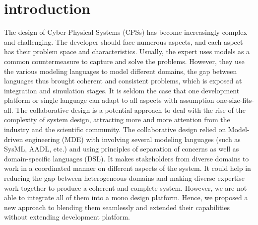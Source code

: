 \section{introduction}
The design of Cyber-Physical Systems (CPSs) has become increasingly complex and challenging.
The developer should face numerous aspects, and each aspect has their problem space and characteristics. Usually, the expert uses models as a common countermeasure to capture and solve the problems. However, they use the various modeling languages to model different domains, the gap between languages thus brought coherent and consistent problems, which is exposed at integration and simulation stages. It is seldom the case that one development platform or single language can adapt to all aspects with assumption one-size-fits-all. The collaborative design is a potential approach to deal with the rise of the complexity of system design, attracting more and more attention from the industry and the scientific community. The collaborative design relied on Model-driven engineering (MDE) with involving several modeling languages (such as SysML, AADL, etc.) and using principles of separation of concerns as well as domain-specific languages (DSL). It makes stakeholders from diverse domains to work in a coordinated manner on different aspects of the system. It could help in reducing the gap between heterogeneous domains and making diverse expertise work together to produce a coherent and complete system. However, we are not able to integrate all of them into a mono design platform. Hence, we proposed a new approach to blending them seamlessly and extended their capabilities without extending development platform. 










